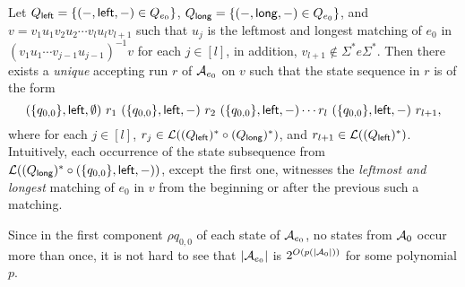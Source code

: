 \begin{itemize}
\begin{itemize}
	\end{itemize}
\end{itemize}

Let $Q_{\mathsf{left}}  = \{ (-, \mathsf{left}, -) \in Q_{e_0} \}$,  $Q_{\mathsf{long}} = \{ (-, \mathsf{long}, -)  \in Q_{e_0}\}$, and $v = v_1 u_1 v_2 u_2 \cdots v_l u_l v_{l+1}$ such that $u_j$ is the leftmost and longest matching of $e_0$ in $(v_1 u_1 \cdots v_{j-1} u_{j-1})^{-1} v$ for each $j \in [l]$, in addition, $v_{l+1} \not \in \Sigma^\ast e \Sigma^\ast$. Then there exists a \emph{unique} accepting run $r$ of $\mathcal{A}_{e_0}$ on $v$ such that the state sequence in $r$ is of the form
%
$$
(\{q_{0,0}\}, \mathsf{left}, \emptyset)\ r_1\ ( \{q_{0,0}\}, \mathsf{left}, -) \ r_2\ ( \{q_{0,0}\}, \mathsf{left}, -)
\cdots r_l\ ( \{q_{0,0}\}, \mathsf{left}, -)\ r_{l+1},
$$
%
where for each $j \in [l]$, $r_j \in \mathcal{L}((Q_{\mathsf{left}})^* \circ (Q_{\mathsf{long}})^*)$, and $r_{l+1} \in \mathcal{L}((Q_{\mathsf{left}})^*)$. Intuitively, each occurrence of the state subsequence from $\mathcal{L}((Q_{\mathsf{long}})^* \circ (\{q_{0,0}\}, \mathsf{left},-))$, except the first one, witnesses the \emph{leftmost and longest} matching of $e_0$ in $v$ from the beginning or after the previous such a matching.

Since in the first component $\rho q_{0,0}$ of each state of $\mathcal{A}_{e_0}$, no states from $\mathcal{A}_0$ occur more than once,  it is not hard to see that $|\mathcal{A}_{e_0}|$ is $2^{O(p(|\mathcal{A}_0|))}$ for some polynomial $p$.



